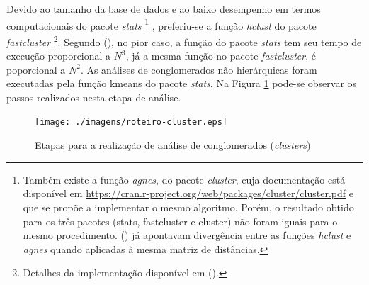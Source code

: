 Devido ao tamanho da base de dados e ao baixo desempenho em termos computacionais do pacote  \textit{stats}
\footnote{Também existe a função \textit{agnes}, do pacote \textit{cluster}, cuja documentação está disponível em \url{https://cran.r-project.org/web/packages/cluster/cluster.pdf} e que se propõe a implementar o mesmo algoritmo. Porém, o resultado obtido para os três pacotes (stats, fastcluster e cluster) não foram iguais para o mesmo procedimento.  (\citeyear{MURTAGH1975}) já apontavam divergência entre as funções \textit{hclust} e \textit{agnes} quando aplicadas à mesma matriz de distâncias.} \cite{RTEAM2011}, preferiu-se a função \textit{hclust} do pacote \textit{fastcluster}
\footnote{Detalhes da implementação disponível em  (\citeyear{MULLNER2011}).}. 
Segundo  (\citeyear{MULLNER2013}), no pior caso, a função do pacote \textit{stats} tem seu tempo de execução proporcional a $N^3$, já a mesma função no pacote \textit{fastcluster}, é poporcional a $N^2$. As análises de conglomerados não hierárquicas foram executadas pela função kmeans do pacote \textit{stats}. Na Figura \ref{fig:roteiro-cluster} pode-se observar os passos realizados nesta etapa de análise.

\begin{figure}[htb]%
    \caption{\label{fig:roteiro-cluster}Etapas para a realização de análise de conglomerados (\textit{clusters})}%
    \begin{center}%
        \texttt{[image: ./imagens/roteiro-cluster.eps]}%
    \end{center}%
\end{figure}%

